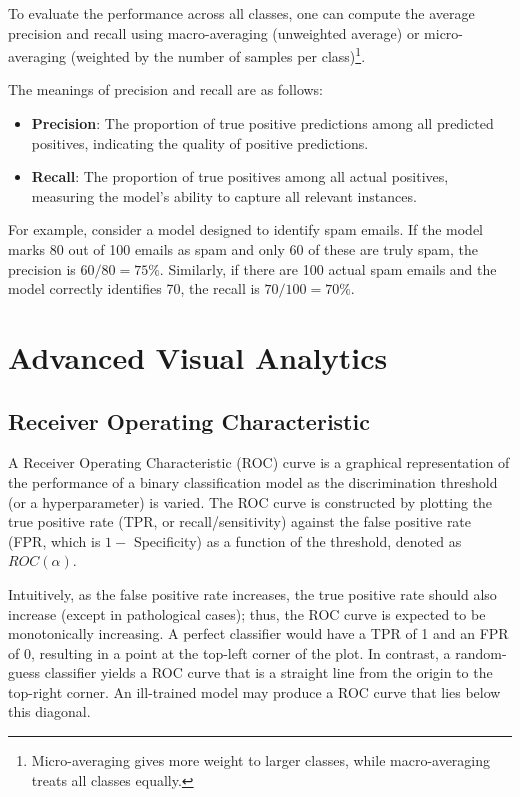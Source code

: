 \documentclass[12pt]{article}
\begin{document}
To evaluate the performance across all classes, one can compute the average precision and recall using macro-averaging (unweighted average) or micro-averaging (weighted by the number of samples per class)\footnote{Micro-averaging gives more weight to larger classes, while macro-averaging treats all classes equally.}.

The meanings of precision and recall are as follows:
\begin{itemize}
    \item \textbf{Precision}: The proportion of true positive predictions among all predicted positives, indicating the quality of positive predictions.
    \item \textbf{Recall}: The proportion of true positives among all actual positives, measuring the model's ability to capture all relevant instances.
\end{itemize}

For example, consider a model designed to identify spam emails. If the model marks 80 out of 100 emails as spam and only 60 of these are truly spam, the precision is \(60/80 = 75\%\). Similarly, if there are 100 actual spam emails and the model correctly identifies 70, the recall is \(70/100 = 70\%\).

\section{Advanced Visual Analytics}

\subsection{Receiver Operating Characteristic}
A Receiver Operating Characteristic (ROC) curve is a graphical representation of the performance of a binary classification model as the discrimination threshold (or a hyperparameter) is varied. The ROC curve is constructed by plotting the true positive rate (TPR, or recall/sensitivity) against the false positive rate (FPR, which is \(1 -\) Specificity) as a function of the threshold, denoted as \(ROC(\alpha)\).

Intuitively, as the false positive rate increases, the true positive rate should also increase (except in pathological cases); thus, the ROC curve is expected to be monotonically increasing. A perfect classifier would have a TPR of 1 and an FPR of 0, resulting in a point at the top-left corner of the plot. In contrast, a random-guess classifier yields a ROC curve that is a straight line from the origin to the top-right corner. An ill-trained model may produce a ROC curve that lies below this diagonal.
\end{document}
